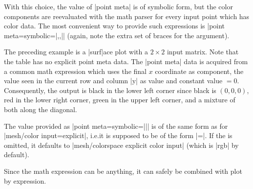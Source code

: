 {{With this choice, the value of |point meta| is of symbolic form, but the color
components are reevaluated with the math parser for every input point which has
color data. The most convenient way to provide such expressions is
|point meta={symbolic={|,,|}}| (again, note the extra
set of braces for the argument).

\begin{codeexample}[]
\end{codeexample}
%
\noindent The preceding example is a |surf|ace plot with a $2 \times 2$ input
matrix. Note that the table has no explicit point meta data. The |point meta|
data is acquired from a common math expression which uses the final $x$
coordinate as  component, the value seen in the current row and
column |y| as  value and constant value $=0$.
Consequently, the output is black in the lower left corner since black is
$(0,0,0)$, red in the lower right corner, green in the upper left corner, and a
mixture of both along the diagonal.

The value provided as |point meta={symbolic=||}| is of the same
form as for |mesh/color input=explicit|, i.e.\@ it is supposed to be of the
form |=|. If the  is
omitted, it defaults to |mesh/colorspace explicit color input| (which is |rgb|
by default).

Since the math expression can be anything, it can safely be combined with plot
by expression.

}}
